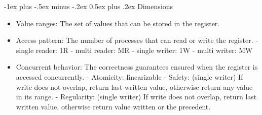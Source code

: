\documentclass[10pt,landscape]{article}
\makeatletter
\renewcommand{\subsection}{\@startsection{subsection}{2}{0mm}%
                                {-1ex plus -.5ex minus -.2ex}%
                                {0.5ex plus .2ex}%
                                {\normalfont\normalsize\bfseries}}
\makeatother
\begin{document}
\begin{multicols}{3}
    \subsection{Dimensions}
    \begin{itemize}[label={--},leftmargin=4mm]
        \vspace{-1mm}
        \itemsep -.4mm
        \item Value ranges: The set of values that can be stored in the register.
        \item Access pattern: The number of processes that can read or write the register.
              \subitem - single reader: 1R
              \subitem - multi reader: MR
              \subitem - single writer: 1W
              \subitem - multi writer: MW
        \item Concurrent behavior: The correctness guarantees ensured when the register is accessed concurrently.
              \subitem - Atomicity: linearizable
              \subitem - Safety: (single writer) If write does not overlap, return last written value, otherwise return any value in its range.
              \subitem - Regularity: (single writer) If write does not overlap, return last written value, otherwise return value written or the precedent.

    \end{itemize}

\end{multicols}
\end{document}
